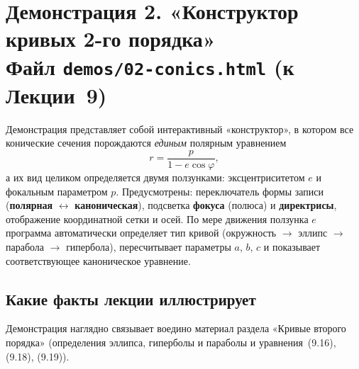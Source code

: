 \section*{Демонстрация 2. «Конструктор кривых 2-го порядка»\\ \normalsize\textmd{Файл \texttt{demos/02-conics.html} \quad(к Лекции~9)}}

Демонстрация представляет собой интерактивный «конструктор», в котором все
конические сечения порождаются \emph{единым} полярным уравнением
\[
  r = \frac{p}{1 - e\cos\varphi},
\]
а их вид целиком определяется двумя ползунками: эксцентриситетом $e$ и
фокальным параметром $p$. Предусмотрены: переключатель формы записи
(\textbf{полярная} $\leftrightarrow$ \textbf{каноническая}), подсветка
\textbf{фокуса} (полюса) и \textbf{директрисы}, отображение координатной
сетки и осей. По мере движения ползунка $e$ программа автоматически
определяет тип кривой (окружность $\to$ эллипс $\to$ парабола $\to$
гипербола), пересчитывает параметры $a$, $b$, $c$ и показывает
соответствующее каноническое уравнение.

\subsection*{Какие факты лекции иллюстрирует}

Демонстрация наглядно связывает воедино материал раздела «Кривые второго
порядка» (определения эллипса, гиперболы и параболы и
уравнения~(9.16), (9.18), (9.19)).

